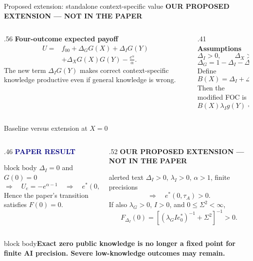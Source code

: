 \documentclass[aspectratio=169,10pt]{beamer}
\newcommand{\paperlabel}{\textcolor{Navy}{\scriptsize\bfseries PAPER RESULT}}
\newcommand{\extlabel}{\textcolor{Alert}{\scriptsize\bfseries OUR PROPOSED EXTENSION --- NOT IN THE PAPER}}
\newcommand{\softbox}[1]{\begin{beamercolorbox}[rounded=true,sep=.6em]{block body}#1\end{beamercolorbox}}
\begin{document}
\begin{frame}{Proposed extension: standalone context-specific value}
  \extlabel
  \vspace{.12cm}
  \begin{columns}[T,onlytextwidth]
    \begin{column}{.56\textwidth}
      \textbf{Four-outcome expected payoff}
      \[
      \boxed{\begin{aligned}
      U={}&f_{00}+\Delta_GG(X)+\Delta_IG(Y)\\
          &+\Delta_XG(X)G(Y)-\frac{e^\alpha}{\alpha}.
      \end{aligned}}
      \]
      \small The new term $\Delta_IG(Y)$ makes correct context-specific
      knowledge productive even if general knowledge is wrong.
    \end{column}
    \begin{column}{.41\textwidth}
      \textbf{Assumptions}
      \[
      \Delta_I>0,\qquad \Delta_X>0,
      \]
      \[
      \Delta_G=1-\Delta_I-\Delta_X\ge0.
      \]
      Define
      \[
        B(X)=\Delta_I+\Delta_XG(X)>0.
      \]
      Then the modified FOC is
      \[
        \boxed{B(X)\lambda_Ig(Y)=e^{\alpha-1}}.
      \]
    \end{column}
  \end{columns}
\end{frame}

\begin{frame}{Baseline versus extension at $X=0$}
  \begin{columns}[T,onlytextwidth]
    \begin{column}{.46\textwidth}
      \paperlabel
      \vspace{.12cm}
      \begin{beamercolorbox}[rounded=true,sep=.75em]{block body}
      \centering
      $\Delta_I=0$ and $G(0)=0$
      \[
        \Rightarrow\quad U_e=-e^{\alpha-1}
        \quad\Rightarrow\quad e^*(0,\tau_A)=0.
      \]
      Hence the paper's transition satisfies $F(0)=0$.
      \end{beamercolorbox}
    \end{column}
    \begin{column}{.52\textwidth}
      \extlabel
      \vspace{.12cm}
      \begin{beamercolorbox}[rounded=true,sep=.7em]{alerted text}
      \centering
      $\Delta_I>0$, $\lambda_I>0$, $\alpha>1$, finite precisions
      \[
        \Rightarrow\quad e^*(0,\tau_A)>0.
      \]
      If also $\lambda_G>0$, $I>0$, and $0\le\Sigma^2<\infty$,
      \[
        \boxed{F_{\Delta_I}(0)=
        \left[(\lambda_G I e^*_0)^{-1}+\Sigma^2\right]^{-1}>0.}
      \]
      \end{beamercolorbox}
    \end{column}
  \end{columns}

  \vspace{.35cm}
  \softbox{\centering\bfseries Exact zero public knowledge is no longer a fixed
  point for finite AI precision. Severe low-knowledge outcomes may remain.}
\end{frame}
\end{document}
